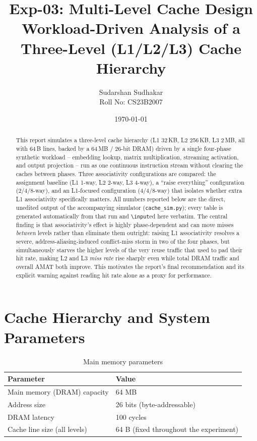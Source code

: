 \documentclass[11pt]{article}
\title{Exp-03: Multi-Level Cache Design\\
\large Workload-Driven Analysis of a Three-Level (L1/L2/L3) Cache Hierarchy}
\author{Sudarshan Sudhakar \\ Roll No: CS23B2007}
\date{\today}
\begin{document}
\maketitle

\begin{abstract}
This report simulates a three-level cache hierarchy (L1 32\,KB, L2 256\,KB,
L3 2\,MB, all with 64\,B lines, backed by a 64\,MB / 26-bit DRAM) driven by a
single four-phase synthetic workload -- embedding lookup, matrix
multiplication, streaming activation, and output projection -- run as one
continuous instruction stream without clearing the caches between phases.
Three associativity configurations are compared: the assignment baseline
(L1 1-way, L2 2-way, L3 4-way), a ``raise everything'' configuration
(2/4/8-way), and an L1-focused configuration (4/4/8-way) that isolates
whether extra L1 associativity specifically matters. All numbers reported
below are the direct, unedited output of the accompanying simulator
(\texttt{cache\_sim.py}); every table is generated automatically from that
run and \texttt{\textbackslash input}ed here verbatim. The central finding
is that associativity's effect is highly phase-dependent and can move
misses \emph{between} levels rather than eliminate them outright: raising
L1 associativity resolves a severe, address-aliasing-induced conflict-miss
storm in two of the four phases, but simultaneously starves the higher
levels of the very reuse traffic that used to pad their hit rate, making L2
and L3 \emph{miss rate} rise sharply even while total DRAM traffic and
overall AMAT both improve. This motivates the report's final
recommendation and its explicit warning against reading hit rate alone as
a proxy for performance.
\end{abstract}

\tableofcontents

\section{Cache Hierarchy and System Parameters}

\begin{table}[H]
\centering
\begin{tabular}{ll}
\toprule
Parameter & Value \\
\midrule
Main memory (DRAM) capacity & 64 MB \\
Address size                & 26 bits (byte-addressable) \\
DRAM latency                & 100 cycles \\
Cache line size (all levels)& 64 B (fixed throughout the experiment) \\
\bottomrule
\end{tabular}
\caption{Main memory parameters}
\end{table}
\end{document}
